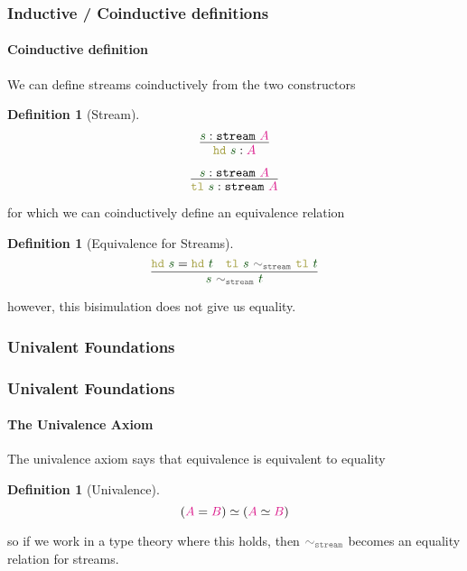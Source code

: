 \documentclass[xelatex,mathserif,serif,notheorems]{beamer} %
\theoremstyle{plain} %
\theoremstyle{definition}
\newtheorem{defn}[thm]{Definition}%
\theoremstyle{remark}
\newcommand*{\term}[1]{\textcolor{green!30!black}{#1}} %
\newcommand*{\type}[1]{\textcolor{magenta!90!black}{#1}}
\newcommand*{\relation}[1]{\textcolor{gray!75!black}{\ensuremath{\mathtt{#1}}}}
\newcommand*{\destructor}[1]{\textcolor{yellow!60!black}{\ensuremath{\mathtt{#1}}}}
\newcommand*{\typeformer}[1]{\ensuremath{\mathtt{#1}}}
\newcommand{\setlengths}{
  \setlength{\abovedisplayskip}{4pt}
  \setlength{\belowdisplayskip}{4pt}
  \setlength{\abovedisplayshortskip}{2pt}
  \setlength{\belowdisplayshortskip}{2pt}
}
\newcommand{\startwitheq}{\vspace{-2.5mm}} %
\begin{document}
\begin{frame}
  \frametitle{Inductive / Coinductive definitions}
  \framesubtitle{Coinductive definition}
  We can define streams coinductively from the two constructors
  \begin{defn}[Stream]\setlengths\startwitheq
    \strut
    \hfill
    \begin{minipage}{0.275\linewidth}
      \begin{equation}
        \vcenter{\infer{\destructor{hd}~\term{s} : \type{A}}{\term{s} : \typeformer{stream}~\type{A}}}
      \end{equation}
    \end{minipage}
    \hfill
    \begin{minipage}{0.3\linewidth}
      \begin{equation}
        \vcenter{\infer{\destructor{tl}~\term{s}: \typeformer{stream}~\type{A}}{\term{s} : \typeformer{stream}~\type{A}}}
      \end{equation}
    \end{minipage}
    \hfill
    \strut
  \end{defn}
  for which we can coinductively define an equivalence relation
  \begin{defn}[Equivalence for Streams]\setlengths %
    \begin{equation}
      \vcenter{\infer{\term{s}~\relation{\sim_{stream}}~\term{t}}{\destructor{hd}~\term{s} = \destructor{hd}~\term{t} & \destructor{tl}~\term{s}~\relation{\sim_{stream}}~\destructor{tl}~\term{t}}}
    \end{equation}
  \end{defn}
  however, this bisimulation does not give us equality.
\end{frame}

\subsubsection{Univalent Foundations}
\begin{frame}
  \frametitle{Univalent Foundations}
  \framesubtitle{The Univalence Axiom}
  The univalence axiom says that equivalence is equivalent to equality
  \begin{defn}[Univalence]\setlengths\startwitheq
    \begin{equation}
      (\type{A} = \type{B}) \simeq (\type{A} \simeq \type{B})
    \end{equation}
  \end{defn}
  so if we work in a type theory where this holds, then \(\relation{\sim_{stream}}\) becomes an equality relation for streams.
\end{frame}
\end{document}
